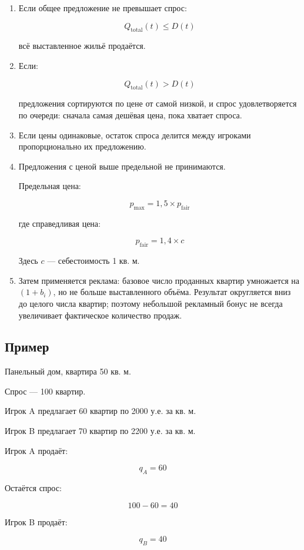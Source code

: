 \documentclass[
]{article}
\begin{document}
\begin{enumerate}
\def\labelenumi{\arabic{enumi}.}
\item
  Если общее предложение не превышает спрос:

  \[
  Q_{\text{total}}(t) \leq D(t)
  \]

  всё выставленное жильё продаётся.
\item
  Если:

  \[
  Q_{\text{total}}(t) > D(t)
  \]

  предложения сортируются по цене от самой низкой, и спрос
  удовлетворяется по очереди: сначала самая дешёвая цена, пока хватает
  спроса.
\item
  Если цены одинаковые, остаток спроса делится между игроками
  пропорционально их предложению.
\item
  Предложения с ценой выше предельной не принимаются.

  Предельная цена:

  \[
  p_{\text{max}}
  =
  1{,}5
  \times
  p_{\text{fair}}
  \]

  где справедливая цена:

  \[
  p_{\text{fair}}
  =
  1{,}4
  \times
  c
  \]

  Здесь \(c\) --- себестоимость 1 кв. м.
\item
  Затем применяется реклама: базовое число проданных квартир
  умножается на \((1+b_i)\), но не больше выставленного объёма. Результат
  округляется вниз до целого числа квартир; поэтому небольшой рекламный
  бонус не всегда увеличивает фактическое количество продаж.
\end{enumerate}

\subsection{Пример}\label{ux43fux440ux438ux43cux435ux440}

Панельный дом, квартира 50 кв. м.

Спрос --- 100 квартир.

Игрок A предлагает 60 квартир по 2000 у.е. за кв. м.

Игрок B предлагает 70 квартир по 2200 у.е. за кв. м.

Игрок A продаёт:

\[
q_A = 60
\]

Остаётся спрос:

\[
100 - 60 = 40
\]

Игрок B продаёт:

\[
q_B = 40
\]
\end{document}
